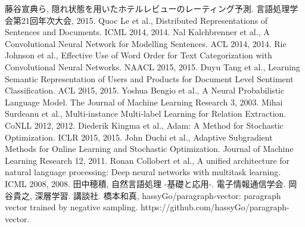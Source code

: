 
\begin{thebibliography}{9}
  藤谷宣典ら,
  隠れ状態を用いたホテルレビューのレーティング予測.
  言語処理学会第21回年次大会, 2015.
  Quoc Le et al.,
  Distributed Representations of Sentences and Documents.
  ICML 2014, 2014.
  Nal Kalchbrenner et al.,
  A Convolutional Neural Network for Modelling Sentences.
  ACL 2014, 2014.
  Rie Johnson et al.,
  Effective Use of Word Order for Text Categorization
  with Convolutional Neural Networks.
  NAACL 2015, 2015.
  Duyu Tang et al.,
  Learning Semantic Representation of Users and Products
  for Document Level Sentiment Classification.
  ACL 2015, 2015.
  Yoshua Bengio et al.,
  A Neural Probabilistic Language Model.
  The Journal of Machine Learning Research 3, 2003.
  Mihai Surdeanu et al.,
  Multi-instance Multi-label Learning for Relation Extraction.
  CoNLL 2012, 2012.
  Diederik Kingma et al.,
  Adam: A Method for Stochastic Optimization.
  ICLR 2015, 2015.
  John Duchi et al.,
  Adaptive Subgradient Methods for Online Learning and Stochastic Optimization.
  Journal of Machine Learning Research 12, 2011.
  Ronan Collobert et al.,
  A unified architecture for natural language processing:
  Deep neural networks with multitask learning.
  ICML 2008, 2008.
  田中穂積,
  自然言語処理 -基礎と応用-.
  電子情報通信学会.
  岡谷貴之,
  深層学習.
  講談社.
  橋本和真,
  hassyGo/paragraph-vector: paragraph vector trained by negative sampling.
  https://github.com/hassyGo/paragraph-vector.
\end{thebibliography}
